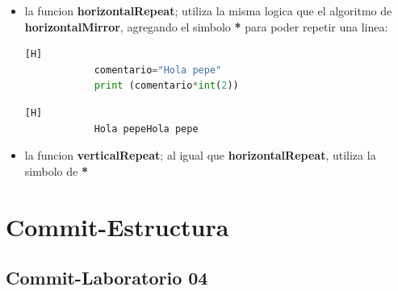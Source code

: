\documentclass{article}
\begin{document}
\begin{itemize}
\begin{itemize}
\begin{lstlisting}[language=python,caption={Resultado de Consola}][H]
            [1,2,3,4,5,6,7]
        \end{lstlisting}
        \item la funcion \textbf{horizontalRepeat}; utiliza la misma logica que el algoritmo de \textbf{horizontalMirror}, agregando el simbolo \textbf{*} para poder repetir una linea:
        \begin{lstlisting}[language=python,caption={Codigo de ejemplo}][H]
            comentario="Hola pepe"
            print (comentario*int(2))
        \end{lstlisting}
        \begin{lstlisting}[language=python,caption={Resultado de Consola}][H]
            Hola pepeHola pepe
        \end{lstlisting}
        \item la funcion \textbf{verticalRepeat}; al igual que \textbf{horizontalRepeat}, utiliza la simbolo de \textbf{*}
	\end{itemize}
    \section{Commit-Estructura}
    \subsection{Commit-Laboratorio 04}

\end{itemize}
\end{document}
